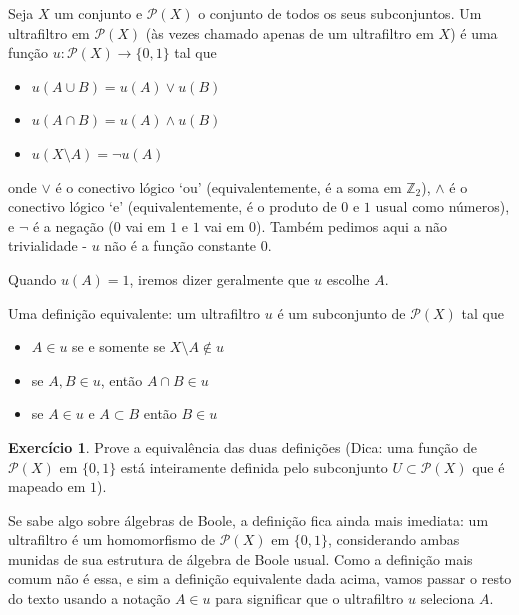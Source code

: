 \documentclass[11pt]{article}
\renewcommand{\textbf}[1]{{\fakebold#1}}
\newcommand{\luafacil}{
\emoji{waxing-crescent-moon}
}
\theoremstyle{definition}
\theoremstyle{definition}
\theoremstyle{definition}
\theoremstyle{definition}
\theoremstyle{definition}
\theoremstyle{definition}
\theoremstyle{definition}
\theoremstyle{definition}
\newtheorem*{definition*}{Definição}
\newenvironment{definicao*}{
\definecolor{shadecolor}{HTML}{defcfc}
\begin{shaded}
\begin{definition*}
}
{
\end{definition*}
\end{shaded}
}
\theoremstyle{definition}
\theoremstyle{definition}
\theoremstyle{definition}
\theoremstyle{definition}
\theoremstyle{definition}
\newtheorem{exersisio}{Exercício}
\newenvironment{exercicio}{
\definecolor{shadecolor}{HTML}{CFB5FF}
\begin{shaded}
\begin{exersisio}
}
{
\end{exersisio}
\end{shaded}
}
\begin{document}
\begin{definicao*}[Ultrafiltro]
Seja $X$ um conjunto e $\mathcal{P}(X)$ o conjunto de todos os seus subconjuntos. Um \textbf{ultrafiltro} em $\mathcal{P}(X)$ (às vezes chamado apenas de um ultrafiltro em $X$) é uma função $u: \mathcal{P}(X) \rightarrow \{0,1\}$ tal que
\begin{itemize}[label=]
  \item $u(A \cup B) = u(A) \vee u(B)$
  \item $u(A \cap B) = u(A) \wedge u(B)$
  \item $u(X \setminus A) = \lnot u(A)$
\end{itemize}
onde $\vee$ é o conectivo lógico `ou' (equivalentemente, é a soma em $\mathbb{Z}_2$), $\wedge$ é o conectivo lógico `e' (equivalentemente, é o produto de $0$ e $1$ usual como números), e $\lnot$ é a negação ($0$ vai em $1$ e $1$ vai em $0$). Também pedimos aqui a não trivialidade - $u$ não é a função constante $0$.

Quando $u(A) = 1$, iremos dizer geralmente que $u$ \textbf{escolhe} $A$.

Uma definição equivalente: um ultrafiltro $u$ é um subconjunto de $\mathcal{P}(X)$ tal que

\begin{itemize}[label=]
\item $A \in u$ se e somente se $X \setminus A \notin u$ 
\item se $A,B \in u$, então $A \cap B \in u$
\item se $A \in u$ e $A \subset B$ então $B \in u$
\end{itemize}

\end{definicao*}

\begin{exercicio}
  \luafacil Prove a equivalência das duas definições (Dica: uma função de $\mathcal{P}(X)$ em $\{0,1\}$ está inteiramente definida pelo subconjunto $U \subset \mathcal{P}(X)$ que é mapeado em $1$).
\end{exercicio}

Se sabe algo sobre álgebras de Boole, a definição fica ainda mais imediata: um ultrafiltro é um homomorfismo de $\mathcal{P}(X)$ em $\{0,1\}$, considerando ambas munidas de sua estrutura de álgebra de Boole usual. Como a definição mais comum não é essa, e sim a definição equivalente dada acima, vamos passar o resto do texto usando a notação $A \in u$ para significar que o ultrafiltro $u$ seleciona $A$.
\end{document}
